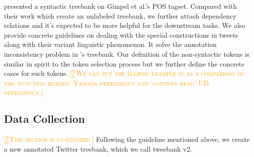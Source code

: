 \documentclass[11pt,letterpaper]{article}
\newcommand{\yjcomment}[1]{\textcolor{orange}{[$_\mathrm{L}^\mathrm{Y}$\textsc{#1}]}}
\begin{document}
 presented a syntactic treebank on Gimpel et al.'s POS tagset.
Compared with their work which create an unlabeled treebank, we further attach dependency relations and it's expected to be more helpful for the downstream tasks.
We also provide concrete guidelines on dealing with the special constructions in tweets along with their variant linguistic phenomenon.
It solve the annotation inconsistency problem in 's treebank.
Our definition of the non-syntactic tokens is similar in spirit to the token selection process but we further define the concrete cases for such tokens.
\yjcomment{We can put the ellipsis example in as a comparison of the `function headed' Yamada dependency and `content head' UD dependency.}

\subsection{Data Collection}
\yjcomment{This section is un-finished.}
Following the guideline mentioned above, we create a new annotated Twitter treebank, which we call tweebank v2.
\end{document}

